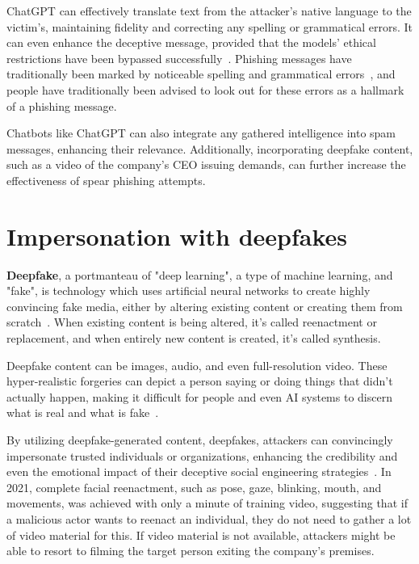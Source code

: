 ChatGPT can effectively translate text from the attacker’s native language to the victim’s, maintaining fidelity and correcting any spelling or grammatical errors. It can even enhance the deceptive message, provided that the models' ethical restrictions have been bypassed successfully~\citep{gupta_From_ChatGPT_to_ThreatGPT_2023}.
Phishing messages have traditionally been marked by noticeable spelling and grammatical errors~\citep{herley_So_Long_No_Thanks_Externalities_2009}, and people have traditionally been advised to look out for these errors as a hallmark of a phishing message.


Chatbots like ChatGPT can also integrate any gathered intelligence into spam messages, enhancing their relevance. Additionally, incorporating deepfake content, such as a video of the company’s CEO issuing demands, can further increase the effectiveness of spear phishing attempts.



\section{Impersonation with deepfakes}
\begin{comment}

    - How deepfake models are trained?

\end{comment}

\textbf{Deepfake}, a portmanteau of "deep learning", a type of machine learning, and "fake", is technology which uses artificial neural networks to create highly convincing fake media, either by altering existing content or creating them from scratch~\citep{mirsky_Creation_Detection_Deepfakes_2021}. When existing content is being altered, it's called reenactment or replacement, and when entirely new content is created, it's called synthesis.

Deepfake content can be images, audio, and even full-resolution video. These hyper-realistic forgeries can depict a person saying or doing things that didn't actually happen, making it difficult for people and even AI systems to discern what is real and what is fake~\citep{blauth_AI_Crime_Overview_Malicious_Use_Abuse_2022}.


By utilizing deepfake-generated content, deepfakes, attackers can convincingly impersonate trusted individuals or organizations, enhancing the credibility and even the emotional impact of their deceptive social engineering strategies~\citep{mirsky_Creation_Detection_Deepfakes_2021}. In 2021, complete facial reenactment, such as pose, gaze, blinking, mouth, and movements, was achieved with only a minute of training video, suggesting that if a malicious actor wants to reenact an individual, they do not need to gather a lot of video material for this. If video material is not available, attackers might be able to resort to filming the target person exiting the company's premises.



